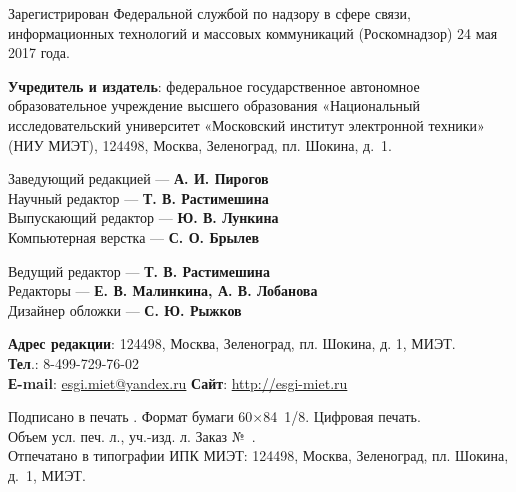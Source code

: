 \begin{flushleft}
\footnotesize
Зарегистрирован Федеральной службой по надзору в сфере связи, информационных технологий
и массовых коммуникаций (Роскомнадзор) 24 мая 2017 года.


\textbf{Учредитель и издатель}: федеральное государственное автономное образовательное учреждение
высшего образования «Национальный исследовательский университет «Московский институт
электронной техники» (НИУ МИЭТ), 124498, Москва, Зеленоград, пл. Шокина, д. 1.
\end{flushleft}

\noindent
\begin{minipage}[t]{.48\textwidth}
    
    \begin{flushleft}
        \footnotesize
        Заведующий редакцией — \textbf{А. И. Пирогов}\\
        Научный редактор — \textbf{Т. В. Растимешина}\\
        Выпускающий редактор — \textbf{Ю. В. Лункина}\\
        Компьютерная верстка — \textbf{С. О. Брылев}
    \end{flushleft}
\end{minipage}\hspace{0.04\textwidth}
\begin{minipage}[t]{.48\textwidth}
    \begin{flushleft}
        \footnotesize
Ведущий редактор — \textbf{Т. В. Растимешина}\\
Редакторы — \textbf{Е. В. Малинкина, А. В. Лобанова}\\
Дизайнер обложки — \textbf{С. Ю. Рыжков}
    \end{flushleft}
\end{minipage}

\begin{flushleft}
    \small
    \textbf{Адрес редакции}: 124498, Москва, Зеленоград, пл. Шокина, д. 1, МИЭТ.\\
    \textbf{Тел}.: 8-499-729-76-02\\
    \textbf{Е-mail}: \href{mailto:esgi.miet@yandex.ru}{esgi.miet@yandex.ru} \hspace{3em}
    \textbf{Сайт}: \url{http://esgi-miet.ru}

     \vspace{1em}
    Подписано в печать \esgiPDate. Формат бумаги 60\(×\)84 1/8. Цифровая печать.\\
    Объем \esgiUPL{} усл. печ. л., \esgiUIL{} уч.-изд. л. Заказ № \esgiPRN{}.\\
    Отпечатано в типографии ИПК МИЭТ: 124498, Москва, Зеленоград, пл. Шокина, д. 1, МИЭТ.
\end{flushleft}

\normalsize
\setmainlinespread
\newpage